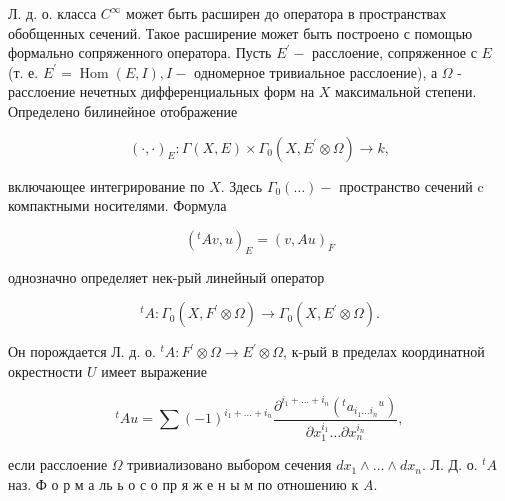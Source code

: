 \documentclass[10pt]{article}
\begin{document}
Л. д. о. класса $C^{\infty}$ может быть расширен до оператора в пространствах обобщенных сечений. Такое расширение может быть построено с помощью формально сопряженного оператора. Пусть $E^{\prime}-$ расслоение, сопряженное с $E$ (т. е. $E^{\prime}=\operatorname{Hom}(E, I), I-$ одномерное тривиальное расслоение), а $\Omega$ - расслоение нечетных дифференциальных форм на $X$ максимальной степени. Определено билинейное отображение



\[

(\cdot, \cdot)_{E}: \Gamma(X, E) \times \Gamma_{0}\left(X, E^{\prime} \otimes \Omega\right) \longrightarrow k,

\]



включающее интегрирование по $X$. Здесь $\Gamma_{0}(\ldots)-$ пространство сечений $\mathrm{c}$ компактными носителями. Формула



\[

\left({ }^{t} A v, u\right)_{E}=(v, A u)_{F}

\]



однозначно определяет нек-рый линейный оператор



\[

{ }^{t} A: \Gamma_{0}\left(X, F^{\prime} \otimes \Omega\right) \longrightarrow \Gamma_{0}\left(X, E^{\prime} \otimes \Omega\right) .

\]



Он порождается Л. д. о. ${ }^{t} A: F^{\prime} \otimes \Omega \rightarrow E^{\prime} \otimes \Omega$, к-рый в пределах координатной окрестности $U$ имеет выражение



\[

{ }^{t} A u=\sum(-1)^{i_{1}+\ldots+i_{n}} \frac{\partial^{i_{1}+\ldots+i_{n}}\left({ }^{t} a_{i_{1} \ldots i_{n}}{ }^{u}\right)}{\partial x_{1}^{i_{1}} \ldots \partial x_{n}^{i_{n}}},

\]



если расслоение $\Omega$ тривиализовано выбором сечения $d x_{1} \wedge \ldots \wedge d x_{n}$. Л. Д. о. $^{t} A$ наз. Ф о р м а ль ь о с о пр я ж е н ы м по отношению к $A$.
\end{document}
